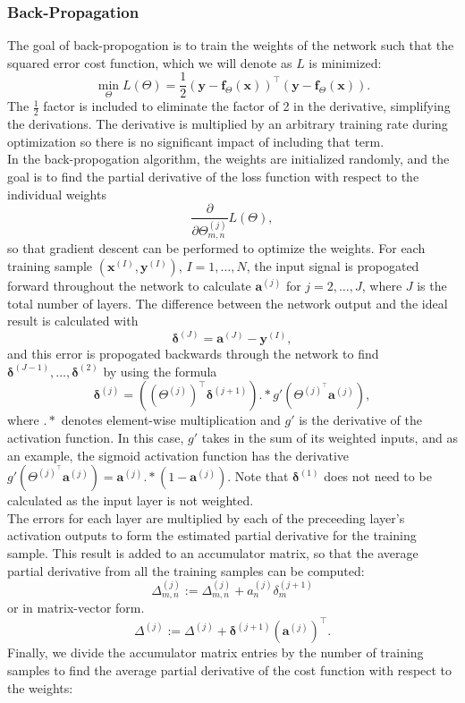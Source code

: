 \documentclass[a4paper,12pt]{article}
\numberwithin{equation}{section}
\begin{document}
\subsubsection{Back-Propagation}
The goal of back-propogation is to train the weights of the network such that the squared error cost function, which we will denote as $L$ is minimized:
\[\min_\Theta L(\Theta)=\frac12 (\bm{y}-\bm{f}_\Theta(\bm{x}))^\top(\bm{y}-\bm{f}_\Theta(\bm{x})).\]
The $\frac12$ factor is included to eliminate the factor of 2 in the derivative, simplifying the derivations. The derivative is multiplied by an arbitrary training rate during optimization so there is no significant impact of including that term.\\
In the back-propogation algorithm, the weights are initialized randomly, and the goal is to find the partial derivative of the loss function with respect to the individual weights \[\frac{\partial}{\partial\Theta_{m,n}^{(j)}}L(\Theta),\]
so that gradient descent can be performed to optimize the weights. For each training sample $(\bm{x}^{(I)},\bm{y}^{(I)})$, $I=1,\dots,N$, the input signal is propogated forward throughout the network to calculate $\bm{a}^{(j)}$ for $j=2,\dots,J$, where $J$ is the total number of layers. The difference between the network output and the ideal result is calculated with 
\[\bm{\delta}^{(J)}=\bm{a}^{(J)}-\bm{y}^{(I)},\] 
and this error is propogated backwards through the network to find $\bm{\delta}^{(J-1)},\dots,\bm{\delta}^{(2)}$ by using the formula 
\[\bm{\delta}^{(j)}=((\Theta^{(j)})^\top \bm{\delta}^{(j+1)}).*g'(\Theta^{(j)^\top} \bm{a}^{(j)}),\] 
where $.*$ denotes element-wise multiplication and $g'$ is the derivative of the activation function. In this case, $g'$ takes in the sum of its weighted inputs, and as an example, the sigmoid activation function has the derivative $g'(\Theta^{(j)^\top} \bm{a}^{(j)})=\bm{a}^{(j)}.*(1-\bm{a}^{(j)})$. Note that $\bm{\delta}^{(1)}$ does not need to be calculated as the input layer is not weighted. \\
The errors for each layer are multiplied by each of the preceeding layer's activation outputs to form the estimated partial derivative for the training sample. This result is added to an accumulator matrix, so that the average partial derivative from all the training samples can be computed:
\[\Delta^{(j)}_{m,n}:=\Delta^{(j)}_{m,n}+a_n^{(j)}\delta_m^{(j+1)}\]
or in matrix-vector form.
\[\Delta^{(j)}:=\Delta^{(j)}+\bm{\delta}^{(j+1)}(\bm{a}^{(j)})^\top.\]
Finally, we divide the accumulator matrix entries by the number of training samples to find the average partial derivative of the cost function with respect to the weights:
\end{document}
